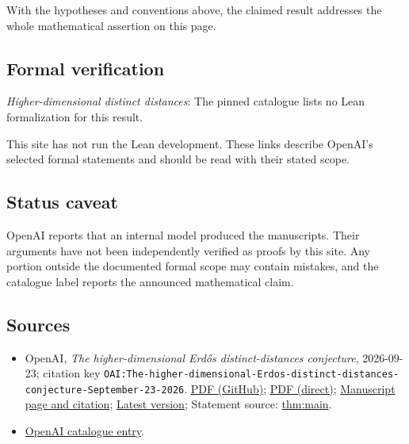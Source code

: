 \documentclass[11pt]{article}
\begin{document}
With the hypotheses and conventions above, the claimed result addresses the whole mathematical assertion on this page.

\subsection{Formal verification}
\textit{Higher-dimensional distinct distances}: The pinned catalogue lists no Lean formalization for this result.

This site has not run the Lean development. These links describe OpenAI’s selected formal statements and should be read with their stated scope.

\subsection{Status caveat}
OpenAI reports that an internal model produced the manuscripts. Their arguments have not been independently verified as proofs by this site. Any portion outside the documented formal scope may contain mistakes, and the catalogue label reports the announced mathematical claim.

\subsection{Sources}
\begin{itemize}
\item OpenAI, \emph{The higher-dimensional Erdős distinct-distances conjecture}, 2026-09-23; citation key \texttt{OAI:The-higher-dimensional-Erdos-distinct-distances-conjecture-September-23-2026}. \href{https://github.com/openai/math/blob/adc7f1241b42e322a6451854ab7e4b4c146bf78a/preprints/The-higher-dimensional-Erdos-distinct-distances-conjecture-September-23-2026/paper.pdf}{PDF (GitHub)}; \href{https://github.com/openai/math/raw/adc7f1241b42e322a6451854ab7e4b4c146bf78a/preprints/The-higher-dimensional-Erdos-distinct-distances-conjecture-September-23-2026/paper.pdf}{PDF (direct)}; \href{https://github.com/openai/math/blob/adc7f1241b42e322a6451854ab7e4b4c146bf78a/preprints/The-higher-dimensional-Erdos-distinct-distances-conjecture-September-23-2026/README.md}{Manuscript page and citation}; \href{https://github.com/openai/math/blob/main/preprints/The-higher-dimensional-Erdos-distinct-distances-conjecture-September-23-2026/paper.pdf}{Latest version}; Statement source: \href{https://github.com/openai/math/blob/adc7f1241b42e322a6451854ab7e4b4c146bf78a/preprints/The-higher-dimensional-Erdos-distinct-distances-conjecture-September-23-2026/build/sections/introduction.tex\#L19}{thm:main}.
\item \href{https://github.com/openai/math/blob/adc7f1241b42e322a6451854ab7e4b4c146bf78a/CONTENTS.md}{OpenAI catalogue entry}.
\end{itemize}
\end{document}
